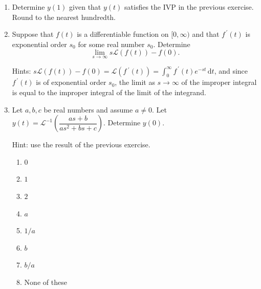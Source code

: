\documentclass{ximera}
\begin{document}
\begin{enumerate}[label=(\arabic*)]


\newpage

\item Determine $y(1)$ given that $y(t)$ satisfies the IVP in the previous exercise.  Round to the nearest hundredth.



\item Suppose that $f(t)$ is a differentiable function on $[0,\infty)$ and that $f^{\,\prime}(t)$ is exponential order $s_0$ for some real number $s_0$.  Determine $$\displaystyle \lim_{s\rightarrow\infty} s\mathcal{L}(f(t))-f(0).$$

Hints: $\displaystyle s\mathcal{L}(f(t))-f(0)=\mathcal{L}(f\,^{\prime}(t))=\int_0^{\infty} f^{\,\prime}(t)e^{-st}\,\mathrm{d}t$, and since $f^{\,\prime}(t)$ is of exponential order $s_0$, the limit as $s\rightarrow \infty$ of the improper integral is equal to the improper integral of the limit of the integrand.




\item Let $a,b,c$ be real numbers and assume $a\neq 0$. Let $y(t)=\mathcal{L}^{-1}\left(\dfrac{as+b}{as^2+bs+c}\right)$.  Determine $y(0)$.  

Hint: use the result of the previous exercise.


\begin{enumerate}[label=(\alph*)]
\item $0$
\item $1$ %
\item $2$
\item $a$
\item $1/a$
\item $b$
\item $b/a$
\item None of these
\end{enumerate}


\end{enumerate}
\end{document}
